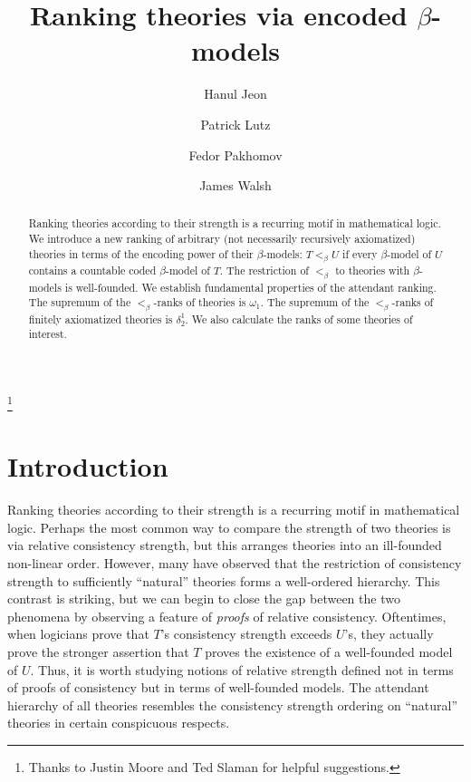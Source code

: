 \documentclass{amsart}
\theoremstyle{remark}
\begin{document}
\title{Ranking theories via encoded $\beta$-models}

\author{Hanul Jeon}
\address{Department of Mathematics, Cornell University}

\author{Patrick Lutz}
\address{Department of Mathematics, University of Michigan, Ann Arbor}

\author{Fedor Pakhomov}
\address{Department of Analysis, Logic and Discrete Mathematics, Ghent University}

\author{James Walsh}
\address{Department of Philosophy, New York University}


\date{}
\dedicatory{}
\thanks{Thanks to Justin Moore and Ted Slaman for helpful suggestions.}


\commby{}

\begin{abstract}
    Ranking theories according to their strength is a recurring motif in mathematical logic. We introduce a new ranking of arbitrary (not necessarily recursively axiomatized) theories in terms of the encoding power of their $\beta$-models: $T<_\beta U$ if every $\beta$-model of $U$ contains a countable coded $\beta$-model of $T$. The restriction of $<_\beta$ to theories with $\beta$-models is well-founded. We establish fundamental properties of the attendant ranking. The supremum of the $<_\beta$-ranks of theories is $\omega_1$. The supremum of the $<_\beta$-ranks of finitely axiomatized theories is $\delta^1_2$. We also calculate the ranks of some theories of interest.
\end{abstract}

\maketitle

\section{Introduction}

Ranking theories according to their strength is a recurring motif in mathematical logic.
Perhaps the most common way to compare the strength of two theories is via relative consistency strength, but this arranges theories into an ill-founded non-linear order. However, many have observed that the restriction of consistency strength to sufficiently ``natural'' theories forms a well-ordered hierarchy. This contrast is striking, but we can begin to close the gap between the two phenomena by observing a feature of \emph{proofs} of relative consistency. Oftentimes, when logicians prove that $T$'s consistency strength exceeds $U$'s, they actually prove the stronger assertion that $T$ proves the existence of a well-founded model of $U$. Thus, it is worth studying notions of relative strength defined not in terms of proofs of consistency but in terms of well-founded models. The attendant hierarchy of all theories resembles the consistency strength ordering on ``natural'' theories in certain conspicuous respects.
\end{document}
